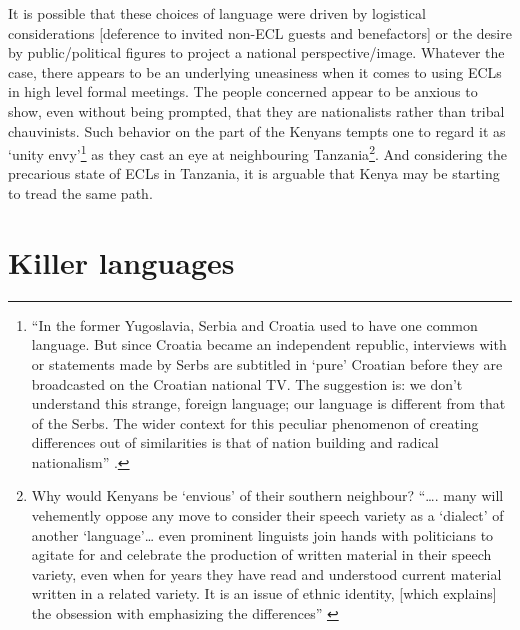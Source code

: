 \documentclass[output=paper,colorlinks,citecolor=brown]{langscibook}
\begin{document}
It is possible that these choices of language were driven by logistical considerations [deference to invited non-ECL guests and benefactors] or the desire by public\slash political figures to project a national perspective\slash image. Whatever the case, there appears to be an underlying uneasiness when it comes to using ECLs in high level formal meetings. The people concerned appear to be anxious to show, even without being prompted, that they are nationalists rather than tribal chauvinists. Such behavior on the part of the Kenyans tempts one to regard it as ‘unity envy’\footnote{“In the former Yugoslavia, Serbia and Croatia used to have one common language. But since Croatia became an independent republic, interviews with or statements made by Serbs are subtitled in ‘pure’ Croatian before they are broadcasted on the Croatian national TV. The suggestion is: we don’t understand this strange, foreign language; our language is different from that of the Serbs. The wider context for this peculiar phenomenon of creating differences out of similarities is that of nation building and radical nationalism” \citep[1]{Blommaert2014}.} as they cast an eye at neighbouring Tanzania\footnote{Why would Kenyans be ‘envious’ of their southern neighbour?  “…. many will vehemently oppose any move to consider their speech variety as a ‘dialect’ of another ‘language’… even prominent linguists join hands with politicians to agitate for and celebrate the production of written material in their speech variety, even when for years they have read and understood current material written in a related variety. It is an issue of ethnic identity, [which explains] the obsession with emphasizing the differences”  \citep[244]{Kioko2017}
}.  And considering the precarious state of ECLs in Tanzania, it is arguable that Kenya may be starting to tread the same path.

\section{Killer languages}\label{sec:kioko:5}
\end{document}
